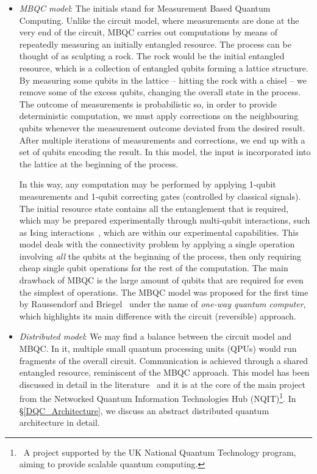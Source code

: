 \begin{itemize}
\item \textit{MBQC model}: The initials stand for Measurement Based Quantum Computing. Unlike the circuit model, where measurements are done at the very end of the circuit, MBQC carries out computations by means of repeatedly measuring an initially entangled resource. The process can be thought of as sculpting a rock. The rock would be the initial entangled resource, which is a collection of entangled qubits forming a lattice structure. By measuring some qubits in the lattice -- hitting the rock with a chisel -- we remove some of the excess qubits, changing the overall state in the process. The outcome of measurements is probabilistic so, in order to provide deterministic computation, we must apply corrections on the neighbouring qubits whenever the measurement outcome deviated from the desired result. After multiple iterations of measurements and corrections, we end up with a set of qubits encoding the result. In this model, the input is incorporated into the lattice at the beginning of the process.

In this way, any computation may be performed by applying 1-qubit measurements and 1-qubit correcting gates (controlled by classical signals). The initial resource state contains all the entanglement that is required, which may be prepared experimentally through multi-qubit interactions, such as Ising interactions~\citep{1WQC}, which are within our experimental capabilities. This model deals with the connectivity problem by applying a single operation involving \textit{all} the qubits at the beginning of the process, then only requiring cheap single qubit operations for the rest of the computation. The main drawback of MBQC is the large amount of qubits that are required for even the simplest of operations. The MBQC model was proposed for the first time by Raussendorf and Briegel~\citep{1WQC} under the name of \textit{one-way quantum computer}, which highlights its main difference with the circuit (reversible) approach. 

\item \textit{Distributed model}: We may find a balance between the circuit model and MBQC. In it, multiple small quantum processing units (QPUs) would run fragments of the overall circuit. Communication is achieved through a shared entangled resource, reminiscent of the MBQC approach. This model has been discussed in detail in the literature~\citep{DistributedQCHW} and it is at the core of the main project from the Networked Quantum Information Technologies Hub (NQIT)\footnote{\, A project supported by the UK National Quantum Technology program, aiming to provide scalable quantum computing.}. In \S\ref{DQC_Architecture}, we discuss an abstract distributed quantum architecture in detail.

\end{itemize}


